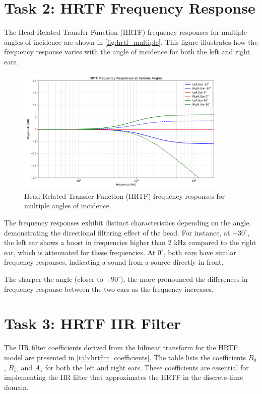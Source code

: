\section{Task 2: HRTF Frequency Response}
\label{sec:results_task2}

The Head-Related Transfer Function (HRTF) frequency responses for multiple angles of incidence are shown in \autoref{fig:hrtf_multiple}. This figure illustrates how the frequency response varies with the angle of incidence for both the left and right ears. 

\begin{figure}[H]
    \centering
    \includegraphics[width=0.9\textwidth]{data/figures/task_2/hrtf_frequency_responses_multiple_angles.png}
    \caption{Head-Related Transfer Function (HRTF) frequency responses for multiple angles of incidence.}
    \label{fig:hrtf_multiple}
\end{figure}

The frequency responses exhibit distinct characteristics depending on the angle, demonstrating the directional filtering effect of the head. For instance, at \(-30^\circ\), the left ear shows a boost in frequencies higher than 2 kHz compared to the right ear, which is attenuated for these frequencies. At \(0^\circ\), both ears have similar frequency responses, indicating a sound from a source directly in front.

The sharper the angle (closer to $\pm 90^\circ$), the more pronounced the differences in frequency response between the two ears as the frequency increases. 

\section{Task 3: HRTF IIR Filter}
\label{sec:results_task3}

The IIR filter coefficients derived from the bilinear transform for the HRTF model are presented in \autoref{tab:hrtfiir_coefficients}. The table lists the coefficients \( B_0 \), \( B_1 \), and \( A_1 \) for both the left and right ears. These coefficients are essential for implementing the IIR filter that approximates the HRTF in the discrete-time domain.

